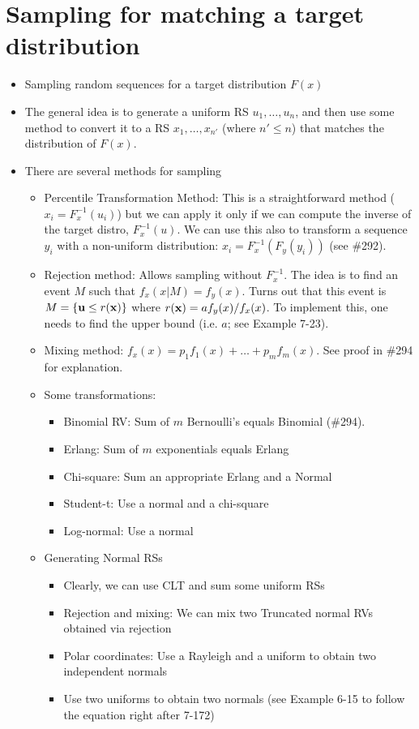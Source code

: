 \documentclass[a4paper, oneside]{book}
\begin{document}
\section{Sampling for matching a target distribution}
\begin{itemize}
\item Sampling random sequences for a target distribution $F(x)$
\item The general idea is to generate a uniform RS $u_1, \hdots, u_n$, and then use some method to convert it to a RS $x_1, \hdots, x_{n'}$ (where $n' \leq n$) that matches the distribution of $F(x)$.
\item There are several methods for sampling
	\begin{itemize}
	\item Percentile Transformation Method: This is a straightforward method ($x_i=F^{-1}_x(u_i)$) but we can apply it only if we can compute the inverse of the target distro, $F^{-1}_x(u)$. We can use this also to transform a sequence $y_i$ with a non-uniform distribution: $x_i=F_x^{-1}\left(F_y(y_i)\right)$ (see \#292).
	\item Rejection method: Allows sampling without $F^{-1}_x$. The idea is to find an event $M$ such that $f_x(x|M) = f_y(x)$. Turns out that this event is $M=\{\mathbf{u}\leq r(\mathbf{x})\}$ where $r(\mathbf{x}) = a f_y(x)/f_x(x)$. To implement this, one needs to find the upper bound (i.e. $a$; see Example 7-23). 
	\item Mixing method: $f_x(x) = p_1 f_1(x)+\hdots+p_m f_m(x)$. See proof in \#294 for explanation. 
	\item Some transformations:
		\begin{itemize}
		\item Binomial RV: Sum of $m$ \iid Bernoulli's equals Binomial (\#294).
		\item Erlang: Sum of $m$ \iid exponentials equals Erlang
		\item Chi-square: Sum an appropriate Erlang and a Normal
		\item Student-t: Use a normal and a chi-square
		\item Log-normal: Use a normal
		\end{itemize}
	\item Generating Normal RSs
		\begin{itemize}
		\item Clearly, we can use CLT and sum some uniform RSs
		\item Rejection and mixing: We can mix two Truncated normal RVs obtained via rejection
		\item Polar coordinates: Use a Rayleigh and a uniform to obtain two independent normals
		\item Use two uniforms to obtain two normals (see Example 6-15 to follow the equation right after 7-172)
		\end{itemize}
	\end{itemize}
\end{itemize}
\end{document}
